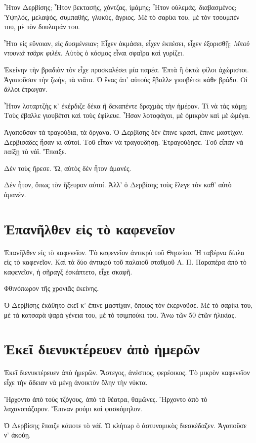 \documentclass[11pt]{article}
\begin{document}
Ἦτον Δερβίσης; Ἦτον βεκτασής, χόντζας, ἰμάμης; Ἦτον οὐλεμάς, διαβασμένος; Ὑψηλός, μελαψός, συμπαθής, γλυκύς, ἄγριος. Μὲ τὸ σαρίκι του, μὲ τὸν τσουμπέν του, μὲ τὸν δουλαμάν του.

Ἦτο εἰς εὔνοιαν, εἰς δυσμένειαν; Εἶχεν ἀκμάσει, εἶχεν ἐκπέσει, εἶχεν ἐξορισθῇ; \emph{Μποὺ ντουνιὰ τσὰρκ φιλέκ}. Αὐτὸς ὁ κόσμος εἶναι σφαῖρα καὶ γυρίζει.

Ἐκείνην τὴν βραδιὰν τὸν εἶχε προσκαλέσει μία παρέα. Ἑπτὰ ἢ ὀκτὼ φίλοι ἀχώριστοι. Ἀγαποῦσαν τὴν ζωήν, τὰ νιᾶτα. Ὁ ἕνας ἀπ' αὐτοὺς ἔβαλλε γιουβέτσι κάθε βράδυ. Οἱ ἄλλοι ἔτρωγαν.

Ἦτον λοταρτζὴς κ' ἐκέρδιζε δέκα ἢ δεκαπέντε δραχμὰς τὴν ἡμέραν. Τί νὰ τὰς κάμῃ; Τοὺς ἔβαλλε γιουβέτσι καὶ τοὺς ἐφίλευε. Ἦσαν λοτοφάγοι, μὲ ὀμικρὸν καὶ μὲ ὠμέγα.

Ἀγαποῦσαν τὰ τραγούδια, τὰ ὄργανα. Ὁ Δερβίσης δὲν ἔπινε κρασί, ἔπινε μαστίχαν. Δερβισάδες ἦσαν κι αὐτοί. Τοῦ εἶπαν νὰ τραγουδήσῃ. Ἐτραγούδησε. Τοῦ εἶπαν νὰ παίξῃ τὸ νάϊ. Ἔπαιξε.

Δὲν τοὺς ἤρεσε. Ὤ, αὐτὸς δὲν ἦτον ἀμανές.

Δὲν ἦτον, ὅπως τὸν ἤξευραν αὐτοί. Ἀλλ' ὁ Δερβίσης τοὺς ἔλεγε τὸν καθ' αὑτὸ ἀμανέν.

\section{Ἐπανῆλθεν εἰς τὸ καφενεῖον}
\label{sec:orge541025}
Ἐπανῆλθεν εἰς τὸ καφενεῖον. Τὸ καφενεῖον ἀντικρὺ τοῦ Θησείου. Ἡ ταβέρνα δίπλα εἰς τὸ καφενεῖον. Καὶ τὰ δύο ἀντικρὺ τοῦ παλαιοῦ σταθμοῦ Α. Π. Παραπέρα ἀπὸ τὸ καφενεῖον, ἡ σῆραγξ ἐσκάπτετο, εἶχε σκαφῆ.

Φθινόπωρον τῆς χρονιᾶς ἐκείνης.

Ὁ Δερβίσης ἐκάθητο ἐκεῖ κ' ἔπινε μαστίχαν, ὅποιος τὸν ἐκερνοῦσε. Μὲ τὸ σαρίκι του, μὲ τὰ κατσαρὰ ψαρὰ γένεια του, μὲ τὸ τσιμπούκι του. Ἄνω τῶν 50 ἐτῶν ἡλικίας.

\section{Ἐκεῖ διενυκτέρευεν ἀπὸ ἡμερῶν}
\label{sec:orgafa0ea7}
Ἐκεῖ διενυκτέρευεν ἀπὸ ἡμερῶν. Ἄστεγος, ἀνέστιος, φερέοικος. Τὸ μικρὸν καφενεῖον εἶχε τὴν ἄδειαν νὰ μένῃ ἀνοικτὸν ὅλην τὴν νύκτα.

Ἤρχοντο ἀπὸ τοὺς τζόγους, ἀπὸ τὰ θέατρα, θαμῶνες. Ἤρχοντο ἀπὸ τὸ λαχανοπάζαρον. Ἔπιναν ρούμι καὶ φασκόμηλον.

Ὁ Δερβίσης ἔπαιζε κάποτε τὸ νάϊ. Ὁ κλήτωρ ὁ ἀστυνομικὸς διεσκέδαζεν. Ἀγαποῦσε ν' ἀκούῃ.
\end{document}
